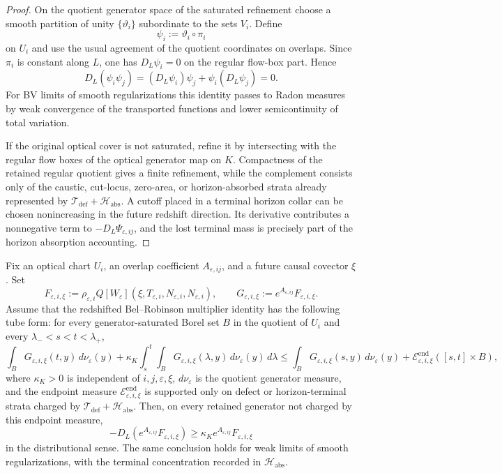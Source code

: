 \begin{proof}
On the quotient generator space of the saturated refinement choose a smooth partition of unity $\{\vartheta_i\}$ subordinate to the sets $V_i$.  Define
\[
    \psi_i:=\vartheta_i\circ\pi_i
\]
on $U_i$ and use the usual agreement of the quotient coordinates on overlaps.  Since $\pi_i$ is constant along $L$, one has $D_L\psi_i=0$ on the regular flow-box part.  Hence
\[
    D_L(\psi_i\psi_j)
    =
    (D_L\psi_i)\psi_j+\psi_i(D_L\psi_j)
    =
    0 .
\]
For BV limits of smooth regularizations this identity passes to Radon measures by weak convergence of the transported functions and lower semicontinuity of total variation.

If the original optical cover is not saturated, refine it by intersecting with the regular flow boxes of the optical generator map on $K$.  Compactness of the retained regular quotient gives a finite refinement, while the complement consists only of the caustic, cut-locus, zero-area, or horizon-absorbed strata already represented by $\mathcal T_{\mathrm{def}}+\mathcal H_{\mathrm{abs}}$.  A cutoff placed in a terminal horizon collar can be chosen nonincreasing in the future redshift direction.  Its derivative contributes a nonnegative term to $-D_L\Psi_{\varepsilon,ij}$, and the lost terminal mass is precisely part of the horizon absorption accounting.
\end{proof}

\begin{theorem}\label{thm:TubeRedshiftDisintegrationStrictFlux}
Fix an optical chart $U_i$, an overlap coefficient $A_{\varepsilon,ij}$, and a future causal covector $\xi$.  Set
\[
    F_{\varepsilon,i,\xi}
    :=
    \rho_{\varepsilon,i}
    Q[W_\varepsilon](\xi,T_{\varepsilon,i},N_{\varepsilon,i},N_{\varepsilon,i}),
    \qquad
    G_{\varepsilon,i,\xi}
    :=
    e^{A_{\varepsilon,ij}}F_{\varepsilon,i,\xi}.
\]
Assume that the redshifted Bel--Robinson multiplier identity has the following tube form: for every generator-saturated Borel set $B$ in the quotient of $U_i$ and every $\lambda_-<s<t<\lambda_+$,
\[
    \int_B G_{\varepsilon,i,\xi}(t,y)\,d\nu_\varepsilon(y)
    +
    \kappa_K
    \int_s^t\int_B G_{\varepsilon,i,\xi}(\lambda,y)\,d\nu_\varepsilon(y)\,d\lambda
    \le
    \int_B G_{\varepsilon,i,\xi}(s,y)\,d\nu_\varepsilon(y)
    +
    \mathcal E^{\mathrm{end}}_{\varepsilon,i,\xi}([s,t]\times B),
\]
where $\kappa_K>0$ is independent of $i,j,\varepsilon,\xi$, $d\nu_\varepsilon$ is the quotient generator measure, and the endpoint measure $\mathcal E^{\mathrm{end}}_{\varepsilon,i,\xi}$ is supported only on defect or horizon-terminal strata charged by $\mathcal T_{\mathrm{def}}+\mathcal H_{\mathrm{abs}}$.
Then, on every retained generator not charged by this endpoint measure,
\[
    -D_L\!\left(e^{A_{\varepsilon,ij}}F_{\varepsilon,i,\xi}\right)
    \ge
    \kappa_K e^{A_{\varepsilon,ij}}F_{\varepsilon,i,\xi}
\]
in the distributional sense.  The same conclusion holds for weak limits of smooth regularizations, with the terminal concentration recorded in $\mathcal H_{\mathrm{abs}}$.
\end{theorem}

